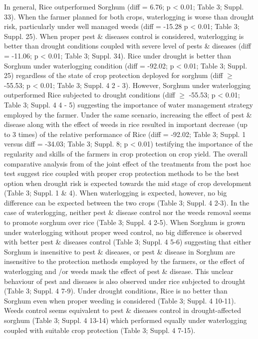 \documentclass[12pt,oneside]{article}
\begin{document}
In general, Rice outperformed Sorghum (diff = 6.76; p \textless{} 0.01; Table 3; Suppl. 33). When the farmer planned for both crops, waterlogging is worse than drought risk, particularly under well managed weeds (diff = -15.28 p \textless{} 0.01; Table 3; Suppl. 25). When proper pest \& diseases control is considered, waterlogging is better than drought conditions coupled with severe level of pests \& diseases (diff = -11.06; p \textless{} 0.01; Table 3; Suppl. 34).
Rice under drought is better than Sorghum under waterlogging condition (diff = -92.02; p \textless{} 0.01; Table 3; Suppl. 25) regardless of the state of crop protection deployed for sorghum (diff \(\geq\) -55.53; p \textless{} 0.01; Table 3; Suppl. 4 2 - 3). However, Sorghum under waterlogging outperformed Rice subjected to drought conditions (diff \(\geq\) -55.53; p \textless{} 0.01; Table 3; Suppl. 4 4 - 5) suggesting the importance of water management strategy employed by the farmer. Under the same scenario, increasing the effect of pest \& disease along with the effect of weeds in rice resulted in important decrease (up to 3 times) of the relative performance of Rice (diff = -92.02; Table 3; Suppl. 1 versus diff = -34.03; Table 3; Suppl. 8; p \textless{} 0.01) testifying the importance of the regularity and skills of the farmers in crop protection on crop yield.
The overall comparative analysis from of the joint effect of the treatments from the post hoc test suggest rice coupled with proper crop protection methods to be the best option when drought risk is expected towards the mid stage of crop development (Table 3; Suppl. 1 \& 4). When waterlogging is expected, however, no big difference can be expected between the two crops (Table 3; Suppl. 4 2-3). In the case of waterlogging, neither pest \& disease control nor the weeds removal seems to promote sorghum over rice (Table 3; Suppl. 4 2-5). When Sorghum is grown under waterlogging without proper weed control, no big difference is observed with better pest \& diseases control (Table 3; Suppl. 4 5-6) suggesting that either Sorghum is insensitive to pest \& diseases, or pest \& disease in Sorghum are insensitive to the protection methods employed by the farmers, or the effect of waterlogging and /or weeds mask the effect of pest \& disease. This unclear behaviour of pest and diseases is also observed under rice subjected to drought (Table 3; Suppl. 4 7-9). Under drought conditions, Rice is no better than Sorghum even when proper weeding is considered (Table 3; Suppl. 4 10-11). Weeds control seems equivalent to pest \& diseases control in drought-affected sorghum (Table 3; Suppl. 4 13-14) which performed equally under waterlogging coupled with suitable crop protection (Table 3; Suppl. 4 7-15).
\end{document}
